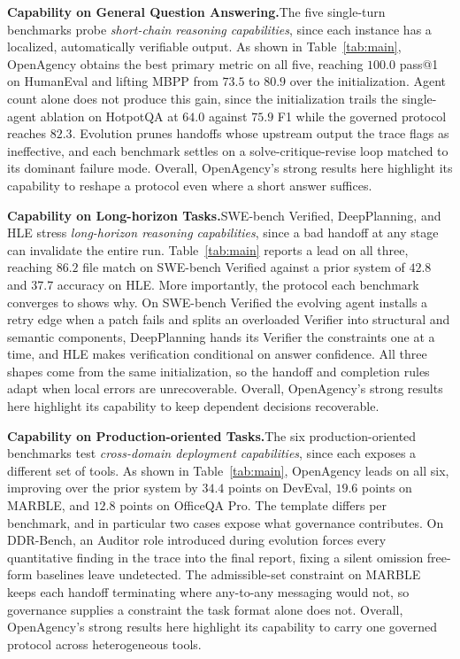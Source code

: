 \documentclass{article} %
\begin{document}
\textbf{Capability on General Question Answering.}\quad The five single-turn benchmarks probe \emph{short-chain reasoning capabilities}, since each instance has a localized, automatically verifiable output. As shown in Table~\ref{tab:main}, OpenAgency obtains the best primary metric on all five, reaching $100.0$ pass@1 on HumanEval and lifting MBPP from $73.5$ to $80.9$ over the initialization. Agent count alone does not produce this gain, since the initialization trails the single-agent ablation on HotpotQA at $64.0$ against $75.9$ F1 while the governed protocol reaches $82.3$. Evolution prunes handoffs whose upstream output the trace flags as ineffective, and each benchmark settles on a solve-critique-revise loop matched to its dominant failure mode. Overall, OpenAgency's strong results here highlight its capability to reshape a protocol even where a short answer suffices.

\textbf{Capability on Long-horizon Tasks.}\quad SWE-bench Verified, DeepPlanning, and HLE stress \emph{long-horizon reasoning capabilities}, since a bad handoff at any stage can invalidate the entire run. Table~\ref{tab:main} reports a lead on all three, reaching $86.2$ file match on SWE-bench Verified against a prior system of $42.8$ and $37.7$ accuracy on HLE. More importantly, the protocol each benchmark converges to shows why. On SWE-bench Verified the evolving agent installs a retry edge when a patch fails and splits an overloaded Verifier into structural and semantic components, DeepPlanning hands its Verifier the constraints one at a time, and HLE makes verification conditional on answer confidence. All three shapes come from the same initialization, so the handoff and completion rules adapt when local errors are unrecoverable. Overall, OpenAgency's strong results here highlight its capability to keep dependent decisions recoverable.

\textbf{Capability on Production-oriented Tasks.}\quad The six production-oriented benchmarks test \emph{cross-domain deployment capabilities}, since each exposes a different set of tools. As shown in Table~\ref{tab:main}, OpenAgency leads on all six, improving over the prior system by $34.4$ points on DevEval, $19.6$ points on MARBLE, and $12.8$ points on OfficeQA Pro. The template differs per benchmark, and in particular two cases expose what governance contributes. On DDR-Bench, an Auditor role introduced during evolution forces every quantitative finding in the trace into the final report, fixing a silent omission free-form baselines leave undetected. The admissible-set constraint on MARBLE keeps each handoff terminating where any-to-any messaging would not, so governance supplies a constraint the task format alone does not. Overall, OpenAgency's strong results here highlight its capability to carry one governed protocol across heterogeneous tools.
\end{document}
